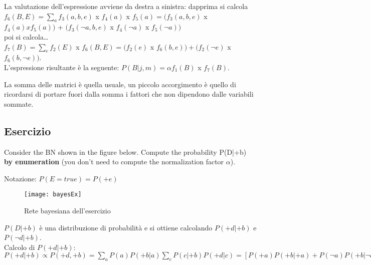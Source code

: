 La valutazione dell'espressione avviene da destra a sinistra: dapprima 
si calcola $f_6(B,E) = \sum_a f_3(a,b,e)$ x $f_4(a)$ x $f_5(a) = (f_3(a,b,e)$ x
$f_4(a) x f_5(a))$ + $(f_3(\neg a,b,e)$ x $f_4(\neg a)$ x $f_5(\neg a))$\\

poi si calcola\dots\\

$f_7(B) = \sum_e f_2(E)$ x $f_6(B,E) = (f_2(e)$ x $f_6(b,e)) + (f_2(\neg e)$ x
$f_6(b, \neg e))$.\\

L'espressione risultante è la seguente: $P(B|j,m) = \alpha f_1(B)$ x $f_7(B)$.

La somma delle matrici è quella usuale, un piccolo accorgimento è quello di
ricordarsi di portare fuori dalla somma i fattori che non dipendono dalle
variabili sommate.

\subsection{Esercizio}

Consider the BN shown in the figure below. Compute the probability
P(D|+b) \textbf{by enumeration} (you don't need to compute the normalization
factor $\alpha$).

Notazione: $P(E = true) = P(+e)$

\begin{figure}[H]
\centering
\texttt{[image: bayesEx]}
\caption{Rete bayesiana dell'esercizio}
\label{fig:bayesEx}
\end{figure}

$P(D|+b)$ è una distribuzione di probabilità e si ottiene calcolando $P(+d|+b)$ e
$P(\neg d|+b)$.\\

Calcolo di $P(+d|+b)$:\\

$P(+d|+b) \propto P(+d, +b) = \sum_a P(a) P(+b|a) \sum_c P(c|+b) P(+d|c) =
[P(+a)P(+b|+a) + P(\neg a) P(+b|\neg a)][P(+c|+b) P(+d|+c) + P(\neg c|+b)
P(+d|\neg c)] = (0.9\cdot 0.7 + 0.1\cdot 0.2)\cdot (0.2\cdot 0.6 + 0.8\cdot 0.9) =
0.546$
